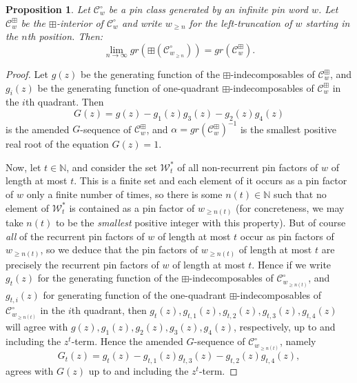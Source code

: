 \documentclass[10pt,a4paper]{amsart}
\theoremstyle{plain}
\newtheorem{prop}[thm]{Proposition}
\theoremstyle{definition}
\theoremstyle{remark}
\begin{document}
\begin{prop} \label{limprop}
Let $\mathcal{C}^{\circ}_{w}$ be a pin class generated by an infinite pin word $w$. Let $\mathcal{C}^{\boxplus}_{w}$ be the $\boxplus$-interior of $\mathcal{C}^{\circ}_{w}$ and write $w_{\geq n}$ for the left-truncation of $w$ starting in the $n$th position. Then:
\[
\lim_{n\rightarrow\infty}gr\left(\boxplus(\mathcal{C}^{\circ}_{w_{\geq n}})\right) = gr(\mathcal{C}^{\boxplus}_{w}).
\]
\end{prop}

\begin{proof}
Let $g(z)$ be the generating function of the $\boxplus$-indecomposables of $\mathcal{C}^{\boxplus}_{w}$, and $g_{i}(z)$ be the generating function of one-quadrant $\boxplus$-indecomposables of $\mathcal{C}^{\boxplus}_{w}$ in the $i$th quadrant. Then
\[
G(z) = g(z) - g_{1}(z)g_{3}(z) - g_{2}(z)g_{4}(z)
\]
is the amended $G$-sequence of $\mathcal{C}^{\boxplus}_{w}$, and $\alpha = gr(\mathcal{C}^{\boxplus}_{w})^{-1}$ is the smallest positive real root of the equation $G(z) = 1$.

Now, let $t \in \mathbb{N}$, and consider the set $\mathcal{W}^{*}_{t}$ of all non-recurrent pin factors of $w$ of length at most $t$. This is a finite set and each element of it occurs as a pin factor of $w$ only a finite number of times, so there is some $n(t) \in \mathbb{N}$ such that no element of $\mathcal{W}^{*}_{t}$ is contained as a pin factor of $w_{\geq n(t)}$ (for concreteness, we may take $n(t)$ to be the \emph{smallest} positive integer with this property). But of course \emph{all} of the recurrent pin factors of $w$ of length at most $t$ occur as pin factors of $w_{\geq n(t)}$, so we deduce that the pin factors of $w_{\geq n(t)}$ of length at most $t$ are precisely the recurrent pin factors of $w$ of length at most $t$. Hence if we write $g_{t}(z)$ for the generating function of the $\boxplus$-indecomposables of $\mathcal{C}^{\circ}_{w_{\geq n(t)}}$, and $g_{t, i}(z)$ for generating function of the one-quadrant $\boxplus$-indecomposables of $\mathcal{C}^{\circ}_{w_{\geq n(t)}}$ in the $i$th quadrant, then $g_{t}(z), g_{t,1}(z), g_{t,2}(z), g_{t,3}(z), g_{t,4}(z)$ will agree with $g(z), g_{1}(z), g_{2}(z), g_{3}(z), g_{4}(z)$, respectively, up to and including the $z^{t}$-term. Hence the amended $G$-sequence of $\mathcal{C}^{\circ}_{w_{\geq n(t)}}$, namely
\[
G_{t}(z) = g_{t}(z) - g_{t,1}(z)g_{t,3}(z) - g_{t,2}(z)g_{t,4}(z) ,
\]
agrees with $G(z)$ up to and including the $z^{t}$-term.


\end{proof}
\end{document}
